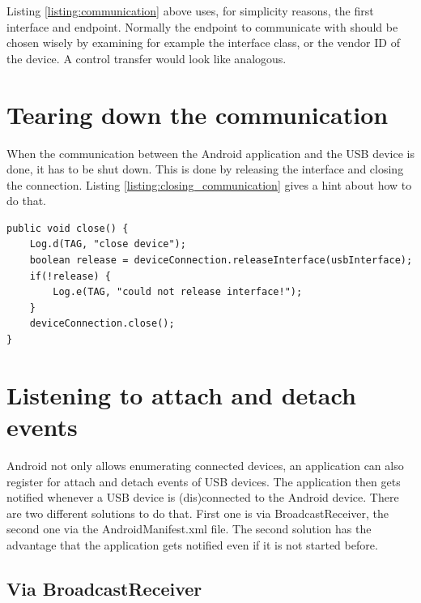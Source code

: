 Listing \ref{listing:communication} above uses, for simplicity reasons, the first interface and endpoint. Normally the endpoint to communicate with should be chosen wisely by examining for example the interface class, or the vendor ID of the device. A control transfer would look like analogous.

\section{Tearing down the communication}

When the communication between the Android application and the USB device is done, it has to be shut down. This is done by releasing the interface and closing the connection. Listing \ref{listing:closing_communication} gives a hint about how to do that.

\begin{lstlisting}[caption=Closing communication, label=listing:closing_communication]
public void close() {
	Log.d(TAG, "close device");
	boolean release = deviceConnection.releaseInterface(usbInterface);
	if(!release) {
		Log.e(TAG, "could not release interface!");
	}
	deviceConnection.close();
}
\end{lstlisting}

\section{Listening to attach and detach events}

Android not only allows enumerating connected devices, an application can also register for attach and detach events of USB devices. The application then gets notified whenever a USB device is (dis)connected to the Android device. There are two different solutions to do that. First one is via BroadcastReceiver, the second one via the AndroidManifest.xml file. The second solution has the advantage that the application gets notified even if it is not started before.

\subsection{Via BroadcastReceiver}

